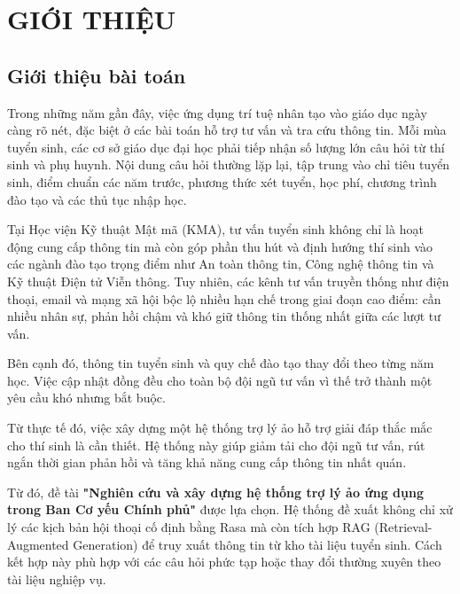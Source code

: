 \chapter{GIỚI THIỆU}
\label{chap:introduction}

\section{Giới thiệu bài toán}
\label{sec:problem_introduction}
Trong những năm gần đây, việc ứng dụng trí tuệ nhân tạo vào giáo dục ngày càng rõ nét, đặc biệt ở các bài toán hỗ trợ tư vấn và tra cứu thông tin. Mỗi mùa tuyển sinh, các cơ sở giáo dục đại học phải tiếp nhận số lượng lớn câu hỏi từ thí sinh và phụ huynh. Nội dung câu hỏi thường lặp lại, tập trung vào chỉ tiêu tuyển sinh, điểm chuẩn các năm trước, phương thức xét tuyển, học phí, chương trình đào tạo và các thủ tục nhập học.

Tại Học viện Kỹ thuật Mật mã (KMA), tư vấn tuyển sinh không chỉ là hoạt động cung cấp thông tin mà còn góp phần thu hút và định hướng thí sinh vào các ngành đào tạo trọng điểm như An toàn thông tin, Công nghệ thông tin và Kỹ thuật Điện tử Viễn thông. Tuy nhiên, các kênh tư vấn truyền thống như điện thoại, email và mạng xã hội bộc lộ nhiều hạn chế trong giai đoạn cao điểm: cần nhiều nhân sự, phản hồi chậm và khó giữ thông tin thống nhất giữa các lượt tư vấn.

Bên cạnh đó, thông tin tuyển sinh và quy chế đào tạo thay đổi theo từng năm học. Việc cập nhật đồng đều cho toàn bộ đội ngũ tư vấn vì thế trở thành một yêu cầu khó nhưng bắt buộc.

Từ thực tế đó, việc xây dựng một hệ thống trợ lý ảo hỗ trợ giải đáp thắc mắc cho thí sinh là cần thiết. Hệ thống này giúp giảm tải cho đội ngũ tư vấn, rút ngắn thời gian phản hồi và tăng khả năng cung cấp thông tin nhất quán.

Từ đó, đề tài \textbf{"Nghiên cứu và xây dựng hệ thống trợ lý ảo ứng dụng trong Ban Cơ yếu Chính phủ"} được lựa chọn. Hệ thống đề xuất không chỉ xử lý các kịch bản hội thoại cố định bằng Rasa mà còn tích hợp RAG (Retrieval-Augmented Generation) để truy xuất thông tin từ kho tài liệu tuyển sinh. Cách kết hợp này phù hợp với các câu hỏi phức tạp hoặc thay đổi thường xuyên theo tài liệu nghiệp vụ.

